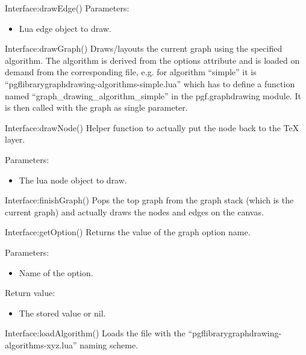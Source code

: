\begin{luacommand}{{Interface:drawEdge}()}
Parameters:
\begin{itemize}
	\item[]  \subitem Lua edge object to draw.
\end{itemize}



\end{luacommand}\begin{luacommand}{{Interface:drawGraph}()}
Draws/layouts the current graph using the specified algorithm.  The algorithm is derived from the options attribute and is loaded on demand from the corresponding file, e.g. for algorithm ``simple'' it is ``pgflibrarygraphdrawing-algorithms-simple.lua'' which has to define a function named ``graph_drawing_algorithm\_simple'' in the pgf.graphdrawing module.  It is then called with the graph as single parameter.



\end{luacommand}\begin{luacommand}{{Interface:drawNode}()}
Helper function to actually put the node back to the TeX layer.

Parameters:
\begin{itemize}
	\item[]  \subitem The lua node object to draw.
\end{itemize}



\end{luacommand}\begin{luacommand}{{Interface:finishGraph}()}
Pops the top graph from the graph stack (which is the current graph) and actually draws the nodes and edges on the canvas.



\end{luacommand}\begin{luacommand}{{Interface:getOption}()}
Returns the value of the graph option name.

Parameters:
\begin{itemize}
	\item[]  \subitem Name of the option.
\end{itemize}


Return value:
\begin{itemize} \item[] The stored value or nil. \end{itemize}


\end{luacommand}\begin{luacommand}{{Interface:loadAlgorithm}()}
Loads the file with the ``pgflibrarygraphdrawing-algorithms-xyz.lua'' naming scheme.


\end{luacommand}
